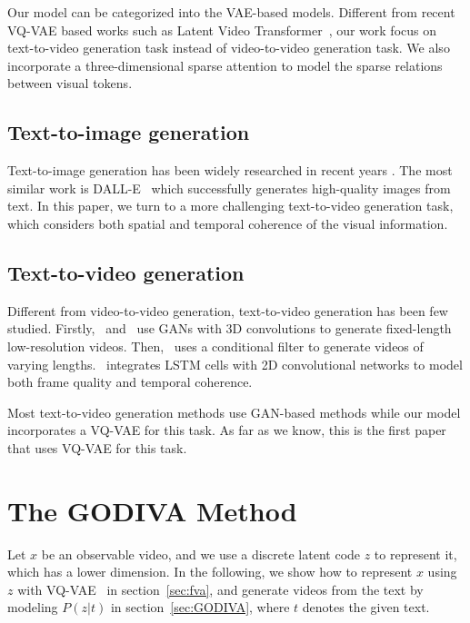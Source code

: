 \documentclass{article}
\begin{document}
Our model can be categorized into the VAE-based models. Different from recent VQ-VAE based works such as Latent Video Transformer~\cite{rakhimovLatentVideoTransformer2020}, our work focus on  text-to-video generation task instead of video-to-video generation task. We also incorporate a three-dimensional sparse attention to model the sparse relations between visual tokens.

\subsection{Text-to-image generation} \label{sec:texttoimage}
Text-to-image generation has been widely researched in recent years \cite{qiaoMirrorGANLearningTexttoimage2019}. The most similar work is DALL-E~\cite{rameshZeroShotTexttoImageGeneration2021} which successfully generates high-quality images from text. In this paper, we turn to a more challenging text-to-video generation task, which considers both spatial and temporal coherence of the visual information.


\subsection{Text-to-video generation} \label{sec:texttovideo}
Different from video-to-video generation, text-to-video generation has been few studied. Firstly,~\cite{liVideoGenerationText2018} and~\cite{panCreateWhatYou2017} use GANs with 3D convolutions to generate fixed-length low-resolution videos. Then,~\cite{balajiConditionalGANDiscriminative2019} uses a conditional filter to generate videos of varying lengths.~\cite{dengIRCGANIntrospectiveRecurrent2019} integrates LSTM cells with 2D convolutional networks to model both frame quality and temporal coherence.

Most text-to-video generation methods use GAN-based methods while our model incorporates a VQ-VAE for this task. As far as we know, this is the first paper that uses VQ-VAE for this task.



\section{The GODIVA Method}
Let $x$ be an observable video, and we use a discrete latent code $z$ to represent it, which has a lower dimension. In the following, we show how to represent $x$ using $z$ with VQ-VAE~\cite{oordNeuralDiscreteRepresentation2017} in section~\ref{sec:fva}, and generate videos from the text by modeling $P(z|t)$ in section~\ref{sec:GODIVA}, where $t$ denotes the given text.
\end{document}
